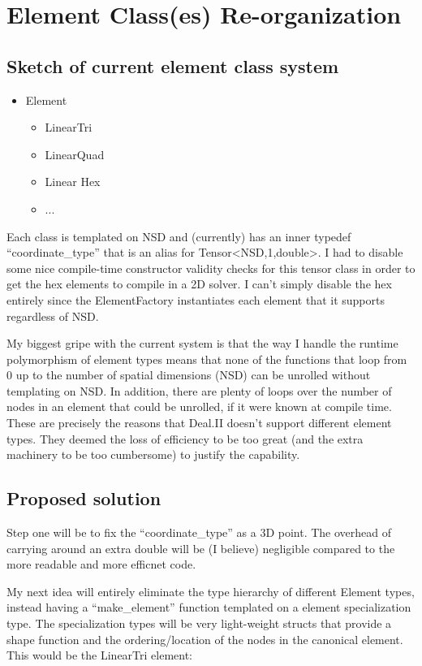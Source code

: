 \documentclass[11pt]{article}
\begin{document}
\section*{Element Class(es) Re-organization}
\subsection*{Sketch of current element class system}

\begin{itemize}
\item
  Element
  \begin{itemize}
  \item LinearTri
  \item LinearQuad
  \item Linear Hex
  \item ...
  \end{itemize}
\end{itemize}
Each class is templated on NSD and (currently) has an inner typedef
``coordinate\_type'' that is an alias for Tensor{\textless}NSD,1,double\textgreater.
I had to disable some nice compile-time constructor validity checks for this 
tensor class in order to get the hex elements to compile in a 2D solver.
I can't simply disable the hex entirely since the ElementFactory instantiates
each element that it supports regardless of NSD.

My biggest gripe with the current system is that the way I handle the
runtime polymorphism of element types means that none of the functions
that loop from 0 up to the number of spatial dimensions (NSD) can be
unrolled without templating on NSD.
In addition, there are plenty of loops over the number of nodes in
an element that could be unrolled, if it were known at compile time.
These are precisely the reasons that Deal.II doesn't support different
element types.
They deemed the loss of efficiency to be too great (and the extra machinery
to be too cumbersome) to justify the capability.


\subsection*{Proposed solution}
Step one will be to fix the ``coordinate\_type'' as a 3D point.
The overhead of carrying around an extra double will be (I believe)
negligible compared to the more readable and more efficnet code.

My next idea will entirely eliminate the type hierarchy of different Element types,
instead having a ``make\_element'' function templated on a element specialization
type.
The specialization types will be very light-weight structs that provide a
shape function and the ordering/location of the nodes in the canonical element.
This would be the LinearTri element:
\end{document}
